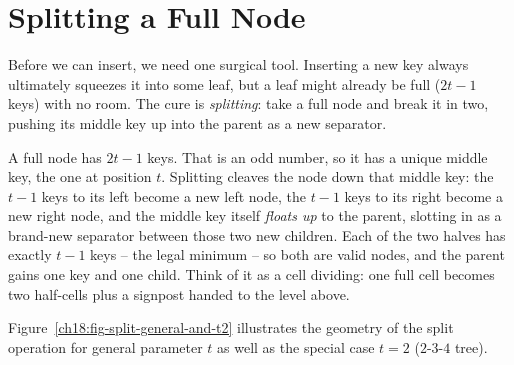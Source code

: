 \section{Splitting a Full Node}

Before we can insert, we need one surgical tool. Inserting a new key always
ultimately squeezes it into some leaf, but a leaf might already be full ($2t-1$
keys) with no room. The cure is \emph{splitting}: take a full node and break it in
two, pushing its middle key up into the parent as a new separator.

\begin{intuitionbox}
A full node has $2t-1$ keys. That is an odd number, so it has a unique middle key,
the one at position $t$. Splitting cleaves the node down that middle key: the
$t-1$ keys to its left become a new left node, the $t-1$ keys to its right become a
new right node, and the middle key itself \emph{floats up} to the parent, slotting
in as a brand-new separator between those two new children. Each of the two halves
has exactly $t-1$ keys -- the legal minimum -- so both are valid nodes, and the
parent gains one key and one child. Think of it as a cell dividing: one full cell
becomes two half-cells plus a signpost handed to the level above.
\end{intuitionbox}

Figure~\ref{ch18:fig-split-general-and-t2} illustrates the geometry of the split operation for general parameter $t$ as well as the special case $t=2$ ($2$-$3$-$4$ tree).

